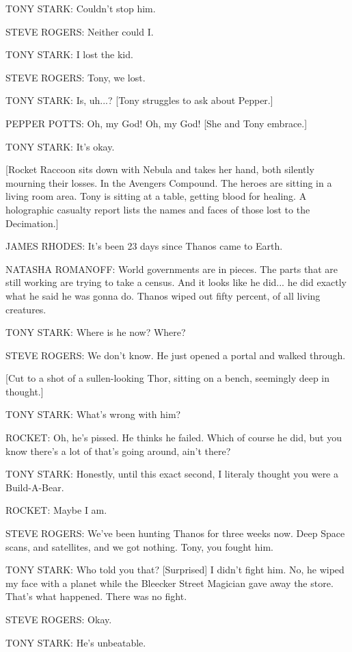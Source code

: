 TONY STARK: Couldn't stop him.

STEVE ROGERS: Neither could I.

TONY STARK: I lost the kid.

STEVE ROGERS: Tony, we lost.

TONY STARK: Is, uh...? [Tony struggles to ask about Pepper.]

PEPPER POTTS: Oh, my God! Oh, my God! [She and Tony embrace.]

TONY STARK: It's okay.

[Rocket Raccoon sits down with Nebula and takes her hand, both silently mourning their losses. In the Avengers Compound. The heroes are sitting in a living room area. Tony is sitting at a table, getting blood for healing. A holographic casualty report lists the names and faces of those lost to the Decimation.]

JAMES RHODES: It's been 23 days since Thanos came to Earth.

NATASHA ROMANOFF: World governments are in pieces. The parts that are still working are trying to take a census. And it looks like he did... he did exactly what he said he was gonna do. Thanos wiped out fifty percent, of all living creatures.

TONY STARK: Where is he now? Where?

STEVE ROGERS: We don't know. He just opened a portal and walked through.

[Cut to a shot of a sullen-looking Thor, sitting on a bench, seemingly deep in thought.]

TONY STARK: What's wrong with him?

ROCKET: Oh, he's pissed. He thinks he failed. Which of course he did, but you know there's a lot of that's going around, ain't there?

TONY STARK: Honestly, until this exact second, I literaly thought you were a Build-A-Bear.

ROCKET: Maybe I am.

STEVE ROGERS: We've been hunting Thanos for three weeks now. Deep Space scans, and satellites, and we got nothing. Tony, you fought him.

TONY STARK: Who told you that? [Surprised] I didn't fight him. No, he wiped my face with a planet while the Bleecker Street Magician gave away the store. That's what happened. There was no fight.

STEVE ROGERS: Okay.

TONY STARK: He's unbeatable.

